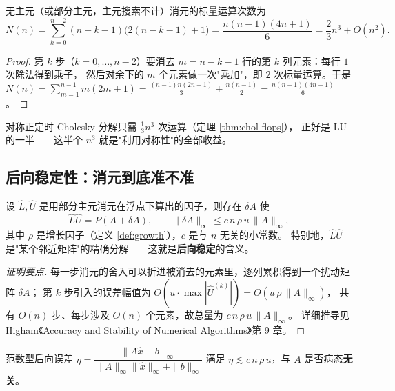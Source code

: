 \begin{theorem}[LU 的运算量]
\label{thm:flops}
无主元（或部分主元，主元搜索不计）消元的标量运算次数为
\begin{equation}
  N(n)=\sum_{k=0}^{n-2}(n-k-1)\bigl(2(n-k-1)+1\bigr)
      =\frac{n(n-1)(4n+1)}{6}=\frac{2}{3}n^3+O(n^2).
  \label{eq:flops}
\end{equation}
\end{theorem}

\begin{proof}
第 $k$ 步（$k=0,\dots,n-2$）要消去 $m=n-k-1$ 行的第 $k$ 列元素：每行 $1$ 次除法得到乘子，
然后对余下的 $m$ 个元素做一次"乘加"，即 $2$ 次标量运算。于是
$N(n)=\sum_{m=1}^{n-1}m(2m+1)=\frac{(n-1)n(2n-1)}{3}+\frac{n(n-1)}{2}
=\frac{n(n-1)(4n+1)}{6}$。
\end{proof}

\begin{remark}
对称正定时 Cholesky 分解只需 $\frac13n^3$ 次运算（定理 \ref{thm:chol-flops}），
正好是 LU 的一半——这半个 $n^3$ 就是"利用对称性"的全部收益。
\end{remark}

\subsection{后向稳定性：消元到底准不准}

\begin{theorem}
\label{thm:wilkinson-backward}
设 $\hat L,\hat U$ 是用部分主元消元在浮点下算出的因子，则存在 $\delta A$ 使
\begin{equation}
  \hat L\hat U=P(A+\delta A),\qquad \|\delta A\|_\infty\le c\,n\,\rho\,u\,\|A\|_\infty,
  \label{eq:backward}
\end{equation}
其中 $\rho$ 是增长因子（定义 \ref{def:growth}），$c$ 是与 $n$ 无关的小常数。
特别地，$\hat L\hat U$ 是"某个邻近矩阵"的精确分解——这就是\textbf{后向稳定}的含义。
\end{theorem}

\begin{proof}[证明要点]
每一步消元的舍入可以折进被消去的元素里，逐列累积得到一个扰动矩阵 $\delta A$；
第 $k$ 步引入的误差幅值为 $O(u\cdot\max|\hat U^{(k)}|)=O(u\,\rho\,\|A\|_\infty)$，
共有 $O(n)$ 步、每步涉及 $O(n)$ 个元素，故总量为 $c\,n\,\rho\,u\,\|A\|_\infty$。
详细推导见 Higham《Accuracy and Stability of Numerical Algorithms》第 9 章。
\end{proof}

\begin{corollary}
范数型后向误差
$\eta=\dfrac{\|A\hat x-b\|_\infty}{\|A\|_\infty\|\hat x\|_\infty+\|b\|_\infty}$
满足 $\eta\lesssim c\,n\,\rho\,u$，与 $A$ 是否病态\textbf{无关}。
\end{corollary}

